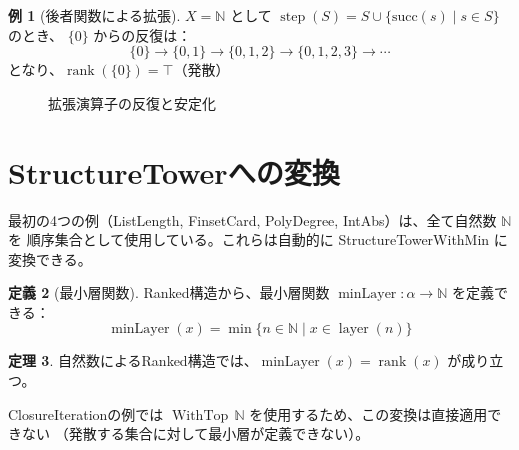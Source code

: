 \documentclass[a4paper,11pt]{ltjsarticle}
\theoremstyle{definition}
\newtheorem{definition}{定義}[section]
\newtheorem{theorem}[definition]{定理}
\newtheorem{example}[definition]{例}
\newcommand{\rank}{\operatorname{rank}}
\newcommand{\layer}{\operatorname{layer}}
\newcommand{\minLayer}{\operatorname{minLayer}}
\newcommand{\step}{\operatorname{step}}
\newcommand{\WithTop}{\operatorname{WithTop}}
\begin{document}
\begin{example}[後者関数による拡張]
$X = \mathbb{N}$ として $\step(S) = S \cup \{\text{succ}(s) \mid s \in S\}$ のとき、
$\{0\}$ からの反復は：
\[
\{0\} \to \{0, 1\} \to \{0, 1, 2\} \to \{0, 1, 2, 3\} \to \cdots
\]
となり、$\rank(\{0\}) = \top$（発散）
\end{example}

\begin{figure}[h]
\centering
{}
\caption{拡張演算子の反復と安定化}
\label{fig:closure-iteration}
\end{figure}

\section{StructureTowerへの変換}

最初の4つの例（ListLength, FinsetCard, PolyDegree, IntAbs）は、全て自然数 $\mathbb{N}$ を
順序集合として使用している。これらは自動的に StructureTowerWithMin に変換できる。

\begin{definition}[最小層関数]
Ranked構造から、最小層関数 $\minLayer : \alpha \to \mathbb{N}$ を定義できる：
\[
\minLayer(x) = \min\{ n \in \mathbb{N} \mid x \in \layer(n) \}
\]
\end{definition}

\begin{theorem}
自然数によるRanked構造では、$\minLayer(x) = \rank(x)$ が成り立つ。
\end{theorem}

ClosureIterationの例では $\WithTop\,\mathbb{N}$ を使用するため、この変換は直接適用できない
（発散する集合に対して最小層が定義できない）。
\end{document}
